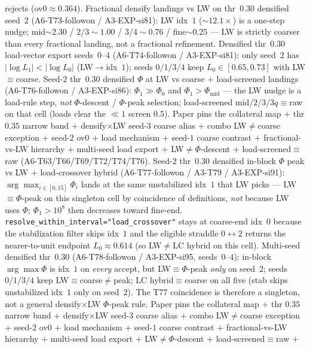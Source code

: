 \documentclass[11pt]{article}
\begin{document}
rejects (ov$0\approx 0.364$). Fractional densify landings vs LW on
thr~$0.30$ densified seed~$2$ (A6-T73-followon / A3-EXP-si81): LW
idx~$1$ ($\sim 12.1\times$) is a one-step nudge; mid$\sim 2.30$ /
$2/3\sim 1.00$ / $3/4\sim 0.76$ / fine$\sim 0.25$ --- LW is strictly
coarser than every fractional landing, not a fractional refinement.
Densified thr~$0.30$ load-vector export seeds~$0$--$4$
(A6-T74-followon / A3-EXP-si81): only seed~$2$ has
$|\log L_1|<|\log L_0|$ (LW$\to$idx~$1$); seeds $0/1/3/4$ keep
$L_0\in[0.65,0.73]$ with LW$\equiv$coarse. Seed-$2$ thr~$0.30$ densified
$\Phi$ at LW vs coarse $+$ load-screened landings (A6-T76-followon /
A3-EXP-si86): $\Phi_1\gg\Phi_0$ and $\Phi_1>\Phi_{\mathrm{mid}}$ --- the
LW nudge is a load-rule step, \emph{not} $\Phi$-descent / $\Phi$-peak
selection; load-screened mid$/2/3/3q\equiv$raw on that cell (loads clear
the $\ll 1$ screen $0.5$). Paper pins the collateral map $+$ thr
$0.35$ narrow band $+$ densify$\times$LW seed-$3$ coarse alias $+$ combo
LW$\neq$coarse exception $+$ seed-$2$ ov$0$ $+$ load mechanism $+$ seed-$1$
coarse contrast $+$ fractional-vs-LW hierarchy $+$ multi-seed load export
$+$ LW$\neq\Phi$-descent $+$ load-screened$\equiv$raw
(A6-T63/T66/T69/T72/T74/T76). Seed-$2$ thr~$0.30$ densified
in-block $\Phi$ peak vs LW $+$ load-crossover hybrid (A6-T77-followon /
A3-T79 / A3-EXP-si91): $\arg\max_{i\in[0,15]}\Phi_i$ lands at the same
unstabilized idx~$1$ that LW picks --- LW$\equiv\Phi$-peak on this
singleton cell by coincidence of definitions, \emph{not} because LW
uses $\Phi$; $\Phi_1>10^{8}$ then decreases toward fine-end.
\texttt{resolve\_within\_interval}\texttt{="load\_crossover"} stays at
coarse-end idx~$0$ because the stabilization filter skips idx~$1$ and
the eligible straddle $0\leftrightarrow 2$ returns the nearer-to-unit
endpoint $L_0\approx 0.614$ (so LW$\neq$LC hybrid on this cell).
Multi-seed densified thr~$0.30$ (A6-T78-followon / A3-EXP-si95,
seeds~$0$--$4$): in-block $\arg\max\Phi$ is idx~$1$ on \emph{every}
accept, but LW$\equiv\Phi$-peak \emph{only} on seed~$2$; seeds
$0/1/3/4$ keep LW$\equiv$coarse$\neq$peak; LC hybrid$\equiv$coarse on
all five (stab skips unstabilized idx~$1$ only on seed~$2$). The T77
coincidence is therefore a singleton, not a general densify$\times$LW
$\Phi$-peak rule. Paper pins the collateral map $+$ thr $0.35$ narrow
band $+$ densify$\times$LW seed-$3$ coarse alias $+$ combo
LW$\neq$coarse exception $+$ seed-$2$ ov$0$ $+$ load mechanism $+$
seed-$1$ coarse contrast $+$ fractional-vs-LW hierarchy $+$ multi-seed
load export $+$ LW$\neq\Phi$-descent $+$ load-screened$\equiv$raw $+$
\end{document}
